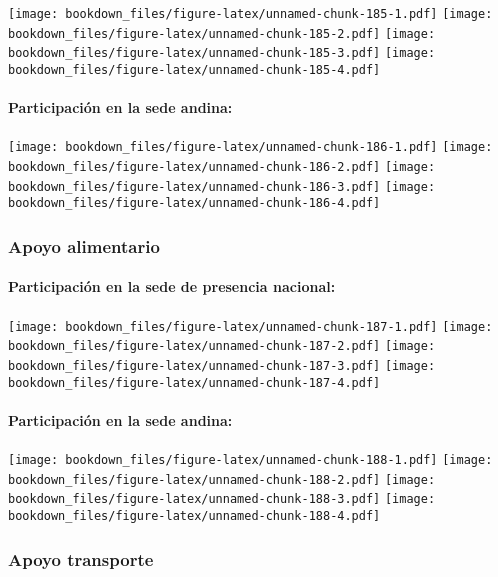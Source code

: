 \documentclass[]{article}
\let\oldparagraph\paragraph
\renewcommand{\paragraph}[1]{\oldparagraph{#1}\mbox{}}
\theoremstyle{definition}
\theoremstyle{definition}
\theoremstyle{definition}
\theoremstyle{remark}
\begin{document}
\texttt{[image: bookdown\_files/figure-latex/unnamed-chunk-185-1.pdf]}
\texttt{[image: bookdown\_files/figure-latex/unnamed-chunk-185-2.pdf]}
\texttt{[image: bookdown\_files/figure-latex/unnamed-chunk-185-3.pdf]}
\texttt{[image: bookdown\_files/figure-latex/unnamed-chunk-185-4.pdf]}

\paragraph{Participación en la sede
andina:}\label{participacion-en-la-sede-andina-9}

\texttt{[image: bookdown\_files/figure-latex/unnamed-chunk-186-1.pdf]}
\texttt{[image: bookdown\_files/figure-latex/unnamed-chunk-186-2.pdf]}
\texttt{[image: bookdown\_files/figure-latex/unnamed-chunk-186-3.pdf]}
\texttt{[image: bookdown\_files/figure-latex/unnamed-chunk-186-4.pdf]}

\subsubsection{Apoyo alimentario}\label{apoyo-alimentario-1}

\paragraph{Participación en la sede de presencia
nacional:}\label{participacion-en-la-sede-de-presencia-nacional-10}

\texttt{[image: bookdown\_files/figure-latex/unnamed-chunk-187-1.pdf]}
\texttt{[image: bookdown\_files/figure-latex/unnamed-chunk-187-2.pdf]}
\texttt{[image: bookdown\_files/figure-latex/unnamed-chunk-187-3.pdf]}
\texttt{[image: bookdown\_files/figure-latex/unnamed-chunk-187-4.pdf]}

\paragraph{Participación en la sede
andina:}\label{participacion-en-la-sede-andina-10}

\texttt{[image: bookdown\_files/figure-latex/unnamed-chunk-188-1.pdf]}
\texttt{[image: bookdown\_files/figure-latex/unnamed-chunk-188-2.pdf]}
\texttt{[image: bookdown\_files/figure-latex/unnamed-chunk-188-3.pdf]}
\texttt{[image: bookdown\_files/figure-latex/unnamed-chunk-188-4.pdf]}

\subsubsection{Apoyo transporte}\label{apoyo-transporte-1}
\end{document}
